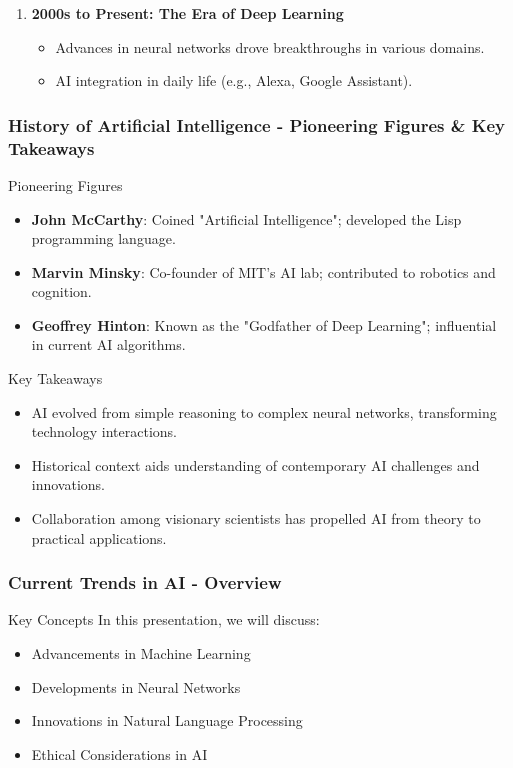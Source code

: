 \documentclass[aspectratio=169]{beamer}
\begin{document}
\begin{frame}[fragile]
\begin{enumerate}
        \item \textbf{2000s to Present: The Era of Deep Learning}
            \begin{itemize}
                \item Advances in neural networks drove breakthroughs in various domains.
                \item AI integration in daily life (e.g., Alexa, Google Assistant).
            \end{itemize}
    \end{enumerate}
\end{frame}

\begin{frame}[fragile]
    \frametitle{History of Artificial Intelligence - Pioneering Figures & Key Takeaways}
    \begin{block}{Pioneering Figures}
        \begin{itemize}
            \item \textbf{John McCarthy}: Coined "Artificial Intelligence"; developed the Lisp programming language.
            \item \textbf{Marvin Minsky}: Co-founder of MIT’s AI lab; contributed to robotics and cognition.
            \item \textbf{Geoffrey Hinton}: Known as the "Godfather of Deep Learning"; influential in current AI algorithms.
        \end{itemize}
    \end{block}
    
    \begin{block}{Key Takeaways}
        \begin{itemize}
            \item AI evolved from simple reasoning to complex neural networks, transforming technology interactions.
            \item Historical context aids understanding of contemporary AI challenges and innovations.
            \item Collaboration among visionary scientists has propelled AI from theory to practical applications.
        \end{itemize}
    \end{block}
\end{frame}

\begin{frame}[fragile]
    \frametitle{Current Trends in AI - Overview}
    \begin{block}{Key Concepts}
        In this presentation, we will discuss:
        \begin{itemize}
            \item Advancements in Machine Learning
            \item Developments in Neural Networks
            \item Innovations in Natural Language Processing
            \item Ethical Considerations in AI
        \end{itemize}
    \end{block}
\end{frame}
\end{document}
